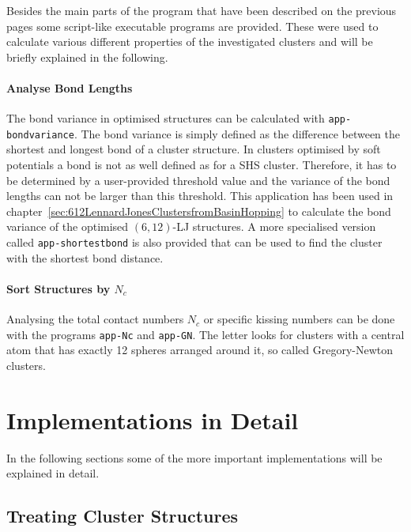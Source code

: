 Besides the main parts of the program that have been described on the previous
pages some script-like executable programs are provided. These were used to calculate
various different properties of the investigated clusters and will be briefly
explained in the following.

\paragraph{Analyse Bond Lengths}%
The bond variance in optimised structures can be calculated with
\texttt{app-bondvariance}. The bond variance is simply defined as the
difference between the shortest and longest bond of a cluster structure. In
clusters optimised by soft potentials a bond is not as well defined as for a
\ac{SHS} cluster. Therefore, it has to be determined by a user-provided
threshold value and the variance of the bond lengths can not be larger than
this threshold. This application has been used in
chapter~\ref{sec:612LennardJonesClustersfromBasinHopping} to calculate the bond
variance of the optimised $(6,12)$-\ac{LJ} structures. A more specialised
version called \texttt{app-shortestbond} is also provided that can be used to
find the cluster with the shortest bond distance.

\paragraph{Sort Structures by $N_c$}%

Analysing the total contact numbers $N_c$ or specific kissing numbers can be
done with the programs \texttt{app-Nc} and \texttt{app-GN}. The letter looks
for clusters with a central atom that has exactly 12 spheres arranged around
it, so called Gregory-Newton clusters.



\section{Implementations in Detail}
\label{sec:ImplementationsinDetail}

In the following sections some of the more important implementations will be
explained in detail.

\subsection{Treating Cluster Structures}
\label{sec:thestructureclass}

